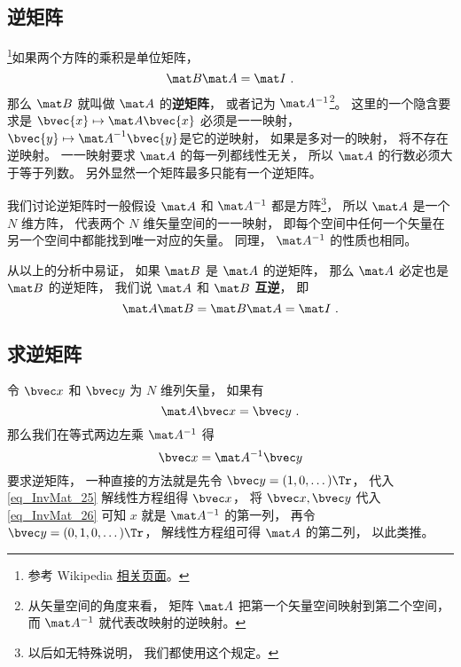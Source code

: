 
\begin{issues}
\issueTODO
\end{issues}


\subsection{逆矩阵}

\footnote{参考 Wikipedia \href{https://en.wikipedia.org/wiki/Invertible_matrix}{相关页面}。}如果两个方阵的乘积是单位矩阵， 
\begin{equation}
\mat B \mat A = \mat I~.
\end{equation}
那么 $\mat B$ 就叫做 $\mat A$ 的\textbf{逆矩阵}， 或者记为 $\mat A^{-1}$\footnote{从矢量空间的角度来看， 矩阵 $\mat A$ 把第一个矢量空间映射到第二个空间， 而 $\mat A^{-1}$ 就代表改映射的逆映射。}。 这里的一个隐含要求是 $\bvec{x} \mapsto \mat A \bvec{x}$ 必须是一一映射，$\bvec{y} \mapsto {\mat A}^{-1} \bvec{y}$是它的逆映射， 如果是多对一的映射， 将不存在逆映射。 一一映射要求 $\mat A$ 的每一列都线性无关，%
所以 $\mat A$ 的行数必须大于等于列数。 另外显然一个矩阵最多只能有一个逆矩阵。

我们讨论逆矩阵时一般假设 $\mat A$ 和 $\mat A^{-1}$ 都是方阵\footnote{以后如无特殊说明， 我们都使用这个规定。}， 所以 $\mat A$ 是一个 $N$ 维方阵， 代表两个 $N$ 维矢量空间的一一映射， 即每个空间中任何一个矢量在另一个空间中都能找到唯一对应的矢量。 同理， $\mat A^{-1}$ 的性质也相同。

从以上的分析中易证， 如果 $\mat B$ 是 $\mat A$ 的逆矩阵， 那么 $\mat A$ 必定也是 $\mat B$ 的逆矩阵， 我们说 $\mat A$ 和 $\mat B$ \textbf{互逆}， 即
\begin{equation}\label{eq_InvMat_2}
\mat A \mat B = \mat B \mat A = \mat I~.
\end{equation}

\subsection{求逆矩阵}
令 $\bvec x$ 和 $\bvec y$ 为 $N$ 维列矢量， 如果有
\begin{equation}\label{eq_InvMat_25}
\mat A \bvec x = \bvec y~.
\end{equation}
那么我们在等式两边左乘 $\mat A^{-1}$ 得
\begin{equation}\label{eq_InvMat_26}
\bvec x = \mat A^{-1} \bvec y
\end{equation}
要求逆矩阵， 一种直接的方法就是先令 $\bvec y = (1, 0, \dots)\Tr$， 代入\autoref{eq_InvMat_25} 解线性方程组得 $\bvec x$， 将 $\bvec x, \bvec y$ 代入\autoref{eq_InvMat_26} 可知 $x$ 就是 $\mat A^{-1}$ 的第一列， 再令 $\bvec y = (0, 1, 0, \dots)\Tr$， 解线性方程组可得 $\mat A$ 的第二列， 以此类推。

